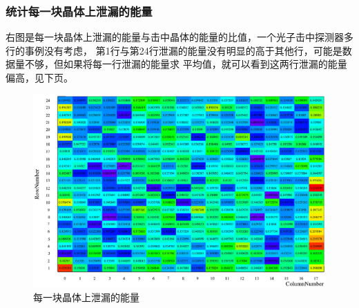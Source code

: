 \documentclass{beamer}
\newcommand{\qihao}{\fontsize{5.25pt}{\baselineskip}\selectfont}
\begin{document}
\begin{CJK*}{UTF8}{gkai}
  \begin{frame}\frametitle{统计每一块晶体上泄漏的能量}
    \begin{minipage}[t]{0.2\textwidth}
      \qihao
      右图是每一块晶体上泄漏的能量与击中晶体的能量的比值，一个光子击中探测器多行的事例没有考虑，
      第1行与第24行泄漏的能量没有明显的高于其他行，可能是数据量不够，但如果将每一行泄漏的能量求
      平均值，就可以看到这两行泄漏的能量偏高，见下页。
    \end{minipage}
    \begin{minipage}[t]{0.8\textwidth}
      \begin{figure}[ht]
        \includegraphics[width=\textwidth]{EscapeCrystalRatio.eps}
	\caption{\qihao 每一块晶体上泄漏的能量}
      \end{figure}
    \end{minipage}
  \end{frame}
  \begin{frame}\frametitle{}
    \begin{figure}[ht]

\end{figure}
\end{frame}
\end{CJK*}
\end{document}
